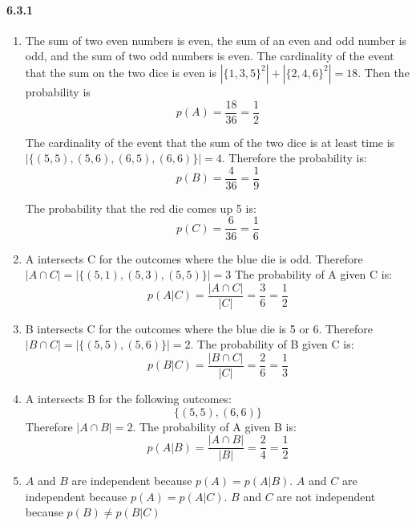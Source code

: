 \documentclass[11pt, letterpaper, twocolumn, fleqn]{article}
\begin{document}
\paragraph{6.3.1}
\begin{enumerate}
  \item The sum of two even numbers is even, the sum of an even and odd number is odd, and the sum of two odd numbers is even. The cardinality of the event that the sum on the two dice is even is $|\{1,3,5\}^2| + |\{2,4,6\}^2| = 18$. Then the probability is 
    $$p(A) = \frac{18}{36} = \frac{1}{2}$$
    
  The cardinality of the event that the sum of the two dice is at least time is $|\{(5,5),(5,6),(6,5),(6,6)\}| = 4$. Therefore the probability is:
    $$p(B) = \frac{4}{36} = \frac{1}{9}$$
    
  The probability that the red die comes up 5 is:
    $$p(C) = \frac{6}{36} = \frac{1}{6}$$
    
  \item A intersects C for the outcomes where the blue die is odd. Therefore $|A \cap C| = |\{(5,1),(5,3),(5,5)\}| = 3$ The probability of A given C is: 
    $$p(A|C) = \frac{|A \cap C|}{|C|} = \frac{3}{6} = \frac{1}{2}$$
    
  \item B intersects C for the outcomes where the blue die is 5 or 6. Therefore $|B \cap C| = |\{(5,5),(5,6)\}| = 2$. The probability of B given C is:
    $$p(B|C) = \frac{|B \cap C|}{|C|} = \frac{2}{6} = \frac{1}{3}$$
    
  \item A intersects B for the following outcomes: 
    $$\{(5,5),(6,6)\}$$
  Therefore $|A \cap B| = 2$. The probability of A given B is:
    $$p(A|B) = \frac{|A \cap B|}{|B|} = \frac{2}{4} = \frac{1}{2}$$
    
  \item $A$ and $B$ are independent because $p(A) = p(A|B)$. $A$ and $C$ are independent because $p(A) = p(A|C)$. $B$ and $C$ are not independent because $p(B) \neq p(B|C)$
\end{enumerate}
\end{document}
